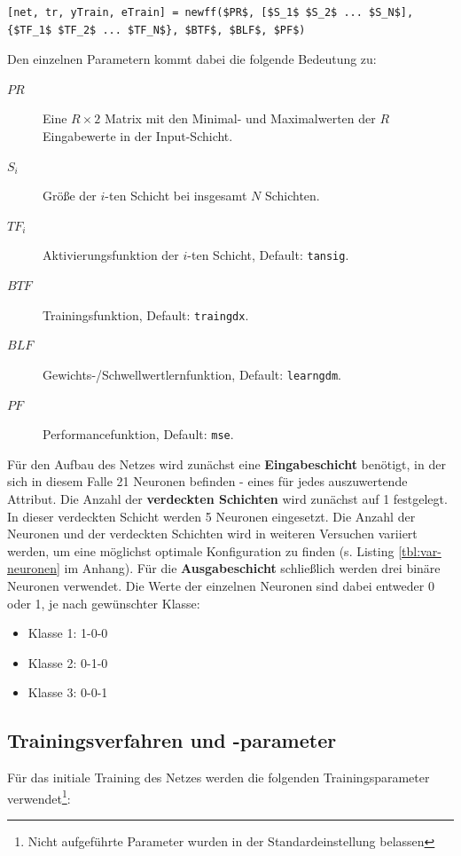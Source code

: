 \begin{lstlisting}[numbers=none]
[net, tr, yTrain, eTrain] = newff($PR$, [$S_1$ $S_2$ ... $S_N$], {$TF_1$ $TF_2$ ... $TF_N$}, $BTF$, $BLF$, $PF$)
\end{lstlisting}

Den einzelnen Parametern kommt dabei die folgende Bedeutung zu:

\begin{description}
  \item[$PR$] Eine $R \times 2$ Matrix mit den Minimal- und Maximalwerten der
  $R$ Eingabewerte in der Input-Schicht.
  \item[$S_i$] Größe der $i$-ten Schicht bei insgesamt $N$ Schichten.
  \item[$TF_i$] Aktivierungsfunktion der $i$-ten Schicht, Default: \texttt{tansig}. 
  \item[$BTF$] Trainingsfunktion, Default: \texttt{traingdx}.
  \item[$BLF$] Gewichts-/Schwellwertlernfunktion, Default: \texttt{learngdm}.
  \item[$PF$] Performancefunktion, Default: \texttt{mse}.
\end{description}

Für den Aufbau des Netzes wird zunächst eine \textbf{Eingabeschicht} benötigt, 
in der sich in diesem Falle 21 Neuronen befinden - eines für jedes 
auszuwertende Attribut. Die Anzahl der \textbf{verdeckten Schichten} wird 
zunächst auf 1 festgelegt. In dieser verdeckten Schicht werden 5 Neuronen
eingesetzt. Die Anzahl der Neuronen und der verdeckten Schichten wird in
weiteren Versuchen variiert werden, um eine möglichst optimale Konfiguration zu
finden (s. Listing \ref{tbl:var-neuronen} im Anhang). Für die 
\textbf{Ausgabeschicht} schließlich werden drei binäre Neuronen verwendet. Die 
Werte der einzelnen Neuronen sind dabei entweder 0 oder 1, je nach gewünschter 
Klasse:

\begin{itemize}
  \item Klasse 1: 1-0-0
  \item Klasse 2: 0-1-0
  \item Klasse 3: 0-0-1
\end{itemize} 

\subsection{Trainingsverfahren und -parameter}
Für das initiale Training des Netzes werden die folgenden Trainingsparameter
verwendet\footnote{Nicht aufgeführte Parameter wurden in der Standardeinstellung
belassen}: 

